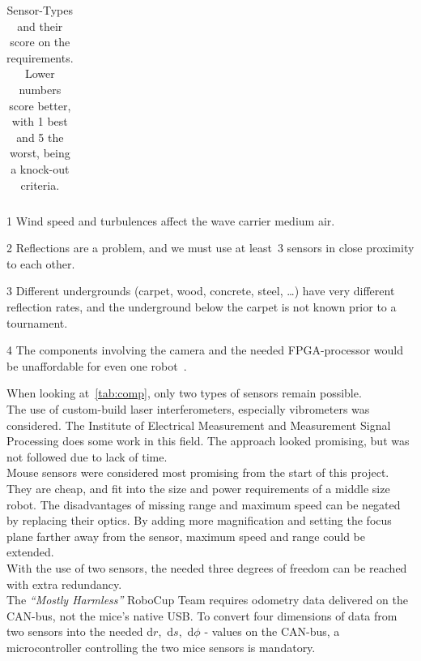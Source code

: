 \documentclass[12pt,a4paper]{article}
\newcommand{\MH}{\emph{``Mostly Harmless''} RoboCup Team\xspace}
\begin{document}
\begin{table}[htbp]
\begin{threeparttable}[b]
\begin{tabular}{rlllllll}
     \hline
  \end{tabular}
  \begin{tablenotes}
  \item [1] Wind speed and turbulences affect the wave carrier medium air.
  \item [2] Reflections are a problem, and we must use at least~3 sensors in close proximity to each other.
  \item [3] Different undergrounds (carpet, wood, concrete, steel, \dots) have very different reflection rates, and the underground below the carpet is not known prior to a tournament.
  \item [4] The components involving the camera and the needed FPGA-processor would be unaffordable for even one robot~\cite{Hrach2006}.
  \end{tablenotes}

  \caption{Sensor-Types and their score on the requirements. Lower numbers score better, with 1 best and 5 the worst, being a knock-out criteria. }
  \label{tab:comp}
 \end{threeparttable}
\end{table}


When looking at~\autoref{tab:comp}, only two types of sensors remain possible.\\
The use of custom-build laser interferometers, especially vibrometers was considered.
The Institute of Electrical Measurement and Measurement Signal Processing does some work in this field.
The approach looked promising, but was not followed due to lack of time.\\
Mouse sensors were considered most promising from the start of this project.
They are cheap, and fit into the size and power requirements of a middle size robot.
The disadvantages of missing range and maximum speed can be negated by replacing their optics.
By adding more magnification and setting the focus plane farther away from the sensor, maximum speed and range could be extended.\\
With the use of two sensors, the needed three degrees of freedom can be reached with extra redundancy.\\
The \MH requires odometry data delivered on the CAN-bus, not the mice's native USB.
To convert four dimensions of data from two sensors into the needed d$r$,~d$s$,~d$\phi$ - values on the CAN-bus, a microcontroller controlling the two mice sensors is mandatory.
\end{document}
